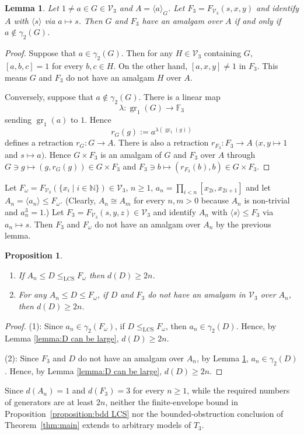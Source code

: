 \documentclass[11pt,reqno]{article}
\newtheorem{lemma}[theorem]{Lemma}
\newtheorem{proposition}[theorem]{Proposition}
\theoremstyle{definition}
\theoremstyle{remark}
\DeclareMathOperator{\gr}{gr}
\newcommand{\LCS}{\mathrm{LCS}}
\begin{document}
\begin{lemma}\label{lemma:amalgam over the cyclic group}
    Let $1\neq a\in G\in\mathcal V_3$ and $A=\langle a \rangle_G$.
    Let $F_3=F_{\mathcal V_3}(s,x,y)$ and identify $A$ with $\langle s\rangle$ via $a\mapsto s$.
    Then $G$ and $F_3$ have an amalgam over $A$ if and only if $a\not\in \gamma_2(G)$.
\end{lemma}
\begin{proof}
    Suppose that $a\in \gamma_2(G)$. Then for any $H\in \mathcal V_3$ containing $G$, $[a,b,c]=1$ for every $b,c\in H$.
    On the other hand, $[a,x,y]\neq 1$ in $F_3$. This means $G$ and $F_3$ do not have an amalgam $H$ over $A$.

    Conversely, suppose that $a\not\in \gamma_2(G)$.
    There is a linear map
    \[ 
        \lambda:\gr_1(G)\to\mathbb F_3
    \]
    sending $\gr_1(a)$ to $1$.
    Hence
    $$ r_G(g):=a^{\lambda(\gr_1(g))} $$
    defines a retraction $r_G:G\to A$.
    There is also a retraction $r_{F_3}:F_3\to A$ $(x,y\mapsto 1$ and $s\mapsto a)$.
    Hence $G\times F_3$ is an amalgam of $G$ and $F_3$ over $A$ through $G\ni g\mapsto (g,r_G(g))\in G\times F_3$ and $F_3\ni b\mapsto (r_{F_3}(b), b) \in G\times F_3$.
\end{proof}


Let $F_\omega=F_{\mathcal V_3}(\{x_i\mid i\in\mathbb N\})\in \mathcal V_3$, $n\geq 1$, $a_n=\prod_{i<n}[x_{2i},x_{2i+1}]$ and let $A_n=\langle a_n\rangle \leq F_\omega$.
(Clearly, $A_n\cong A_m$ for every $n,m>0$ because $A_n$ is non-trivial and $a_n^3=1$.)
Let $F_3=F_{\mathcal V_3}(s,y,z)\in\mathcal V_3$ and identify $A_n$ with $\langle s\rangle\leq F_3$ via $a_n\mapsto s$. Then $F_3$ and $F_\omega$ do not have an amalgam over $A_n$ by the previous lemma.

\begin{proposition}
    \begin{enumerate}
        \item If $A_n\leq D\leq_\LCS F_\omega$ then $d(D)\geq 2n$.
        \item 
        For any $A_n\leq D\leq F_\omega$, if $D$ and $F_3$ do not have an amalgam in $\mathcal V_3$ over $A_n$, then $d(D)\geq 2n$. 
    \end{enumerate}
\end{proposition}

\begin{proof}
    (1): Since $a_n\in \gamma_2(F_\omega)$, if $D\leq_\LCS F_\omega$, then $a_n\in \gamma_2(D)$.
    Hence, by Lemma \ref{lemma:D can be large}, $d(D)\geq 2n$.

    (2): Since $F_3$ and $D$ do not have an amalgam over $A_n$, by Lemma \ref{lemma:amalgam over the cyclic group}, $a_n\in \gamma_2(D)$.
    Hence, by Lemma \ref{lemma:D can be large}, $d(D)\geq 2n$.
\end{proof}
Since $d(A_n)=1$ and $d(F_3)=3$ for every $n\geq1$, while the
required numbers of generators are at least $2n$, neither the
finite-envelope bound in Proposition~\ref{proposition:bdd LCS} nor
the bounded-obstruction conclusion of Theorem~\ref{thm:main} extends
to arbitrary models of $T_3$.
\end{document}

